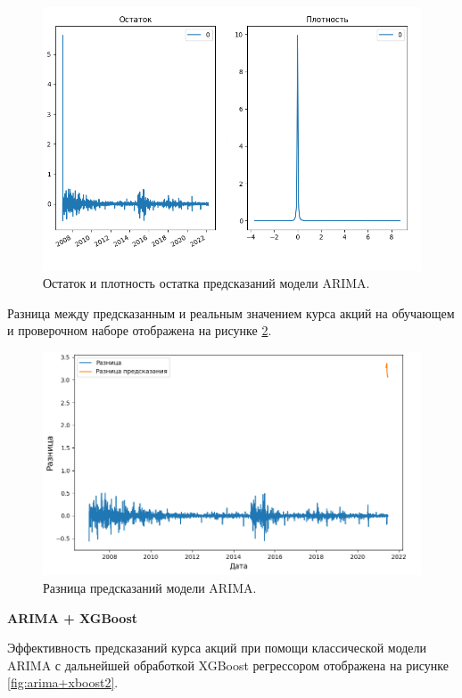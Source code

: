 \begin{figure}[hbtp]
  \centering
  \includegraphics[width=\textwidth]{img/residuals_and_density.png}
  \caption{Остаток и плотность остатка предсказаний модели ARIMA.}
  \label{fig:residuals-and-density}
\end{figure}

\par Разница между предсказанным и реальным значением курса акций на обучающем и проверочном наборе отображена на рисунке \ref{fig:difffit}.

\begin{figure}[hbtp]
  \centering
  \includegraphics[width=\textwidth]{img/difffit.png}
  \caption{Разница предсказаний модели ARIMA.}
  \label{fig:difffit}
\end{figure}

\newpage

\textbf{ARIMA + XGBoost}

\par Эффективность предсказаний курса акций при помощи классической модели ARIMA с дальнейшей обработкой XGBoost регрессором отображена на рисунке \ref{fig:arima+xboost2}.


